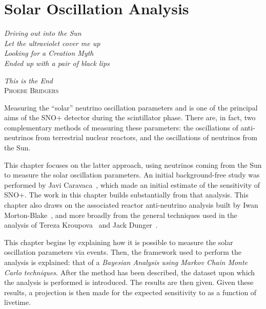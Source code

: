 \chapter{Solar Oscillation Analysis}\label{chap:solar_osc_analysis}
\epigraph{\textit{Driving out into the Sun\\Let the ultraviolet cover me up\\Looking for a Creation Myth\\Ended up with a pair of black lips}}{\textit{This is the End}\\ \textsc{Phoebe Bridgers}}
Measuring the ``solar'' neutrino oscillation parameters \dmsq{} and \tonetwo{} is one of the principal aims of the SNO+ detector during the scintillator phase. There are, in fact, two complementary methods of measuring these parameters: the oscillations of anti-neutrinos from terrestrial nuclear reactors, and the oscillations of neutrinos from the Sun.

This chapter focuses on the latter approach, using \beight{} neutrinos coming from the Sun to measure the solar oscillation parameters. An initial background-free study was performed by Javi Caravaca~\cite{caravacaSNOSensitivityStandard2020}, %
which made an initial estimate of the sensitivity of SNO+. The work in this chapter builds substantially from that analysis. This chapter also draws on the associated reactor anti-neutrino analysis built by Iwan Morton-Blake~\cite{morton-blakeFirstMeasurementReactor2021}, %
and more broadly from the general techniques used in the \onbb{} analysis of Tereza Kroupova~\cite{kroupovaImprovingSensitivityNeutrinoless2020} and Jack Dunger~\cite{dungerTopologicalTimeBased2018}.%

This chapter begins by explaining how it is possible to measure the solar oscillation parameters via \beight{} events. Then, the framework used to perform the analysis is explained: that of a \textit{Bayesian Analysis using Markov Chain Monte Carlo techniques}. After the method has been described, the dataset upon which the analysis is performed is introduced. The results are then given. Given these results, a projection is then made for the expected sensitivity to \tonetwo{} as a function of livetime.


